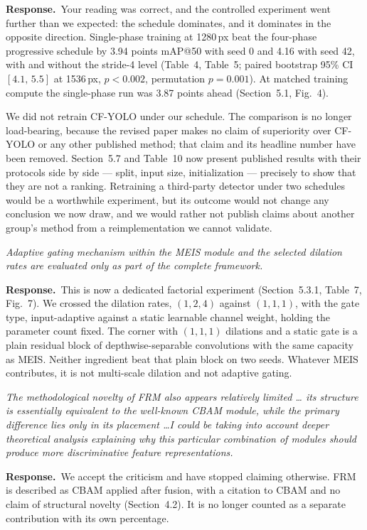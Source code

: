 \documentclass[11pt, a4paper]{article}
\newcommand{\point}[1]{\medskip\noindent\textit{#1}\par}
\newcommand{\reply}{\textbf{Response.}\ }
\begin{document}
\reply Your reading was correct, and the controlled experiment went further than
we expected: the schedule dominates, and it dominates in the opposite direction.
Single-phase training at 1280\,px beat the four-phase progressive schedule by
3.94 points mAP@50 with seed 0 and 4.16 with seed 42, with and without the
stride-4 level (Table~4, Table~5; paired bootstrap 95\% CI $[4.1,\,5.5]$ at
1536\,px, $p<0.002$, permutation $p=0.001$). At matched training compute the
single-phase run was 3.87 points ahead (Section~5.1, Fig.~4).

We did not retrain CF-YOLO under our schedule. The comparison is no longer
load-bearing, because the revised paper makes no claim of superiority over
CF-YOLO or any other published method; that claim and its headline number have
been removed. Section~5.7 and Table~10 now present published results with their
protocols side by side --- split, input size, initialization --- precisely to show
that they are not a ranking. Retraining a third-party detector under two
schedules would be a worthwhile experiment, but its outcome would not change any
conclusion we now draw, and we would rather not publish claims about another
group's method from a reimplementation we cannot validate.

\point{Adaptive gating mechanism within the MEIS module and the selected dilation
rates are evaluated only as part of the complete framework.}

\reply This is now a dedicated factorial experiment (Section~5.3.1, Table~7,
Fig.~7). We crossed the dilation rates, $(1,2,4)$ against $(1,1,1)$, with the gate
type, input-adaptive against a static learnable channel weight, holding the
parameter count fixed. The corner with $(1,1,1)$ dilations and a static gate is a
plain residual block of depthwise-separable convolutions with the same capacity as
MEIS. Neither ingredient beat that plain block on two seeds. Whatever MEIS
contributes, it is not multi-scale dilation and not adaptive gating.

\point{The methodological novelty of FRM also appears relatively limited \dots
its structure is essentially equivalent to the well-known CBAM module, while the
primary difference lies only in its placement \dots I could be taking into account
deeper theoretical analysis explaining why this particular combination of modules
should produce more discriminative feature representations.}

\reply We accept the criticism and have stopped claiming otherwise. FRM is
described as CBAM applied after fusion, with a citation to CBAM and no claim of
structural novelty (Section~4.2). It is no longer counted as a separate
contribution with its own percentage.
\end{document}
